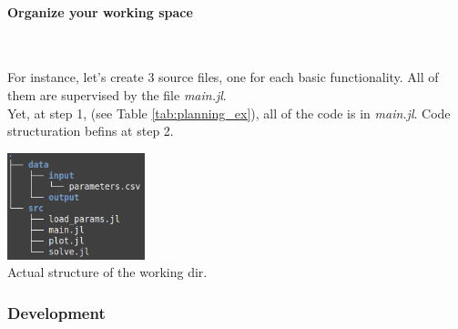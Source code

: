 \documentclass[11pt]{article}
\begin{document}
				\paragraph{Organize your working space}
					\mbox{} \\
					\begin{minipage}{.55\textwidth}
							For instance, let's create 3 source files, one for each basic functionality. All of them are supervised by the file \textit{main.jl}. \\
							Yet, at step 1, (see Table \ref{tab:planning_ex}), all of the code is in \textit{main.jl}.
							Code structuration befins at step 2.
					\end{minipage}
					\begin{minipage}{.30\textwidth}
							\centering
							\includegraphics[width=4cm]{figures/diff_equation/working_dir_beginning}
							\\
							Actual structure of the working dir.

					\end{minipage}
					\newpage

			\subsubsection{Development}
\end{document}

